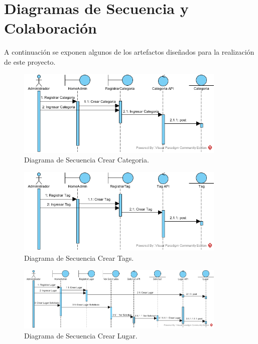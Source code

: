 \documentclass[12pt,letterpaper,openany]{book}
\begin{document}
\chapter{Diagramas de Secuencia y Colaboración}\label{aped.C}
A continuación se exponen algunos de los artefactos diseñados para la realización de este proyecto.
\begin{figure}[H]
\begin{center}
\includegraphics[width=10cm]{./imagenes/DS/DS_crear_categoria}
\caption{Diagrama de Secuencia Crear Categoria.}
\end{center}
\end{figure}

\begin{figure}[H]
\begin{center}
\includegraphics[width=10cm]{./imagenes/DS/DS_crear_tag}
\caption{Diagrama de Secuencia Crear Tags.}
\end{center}
\end{figure}

\begin{figure}[H]
\begin{center}
\includegraphics[width=10cm]{./imagenes/DS/DS_crear_lugar}
\caption{Diagrama de Secuencia Crear Lugar.}
\end{center}
\end{figure}
\end{document}
